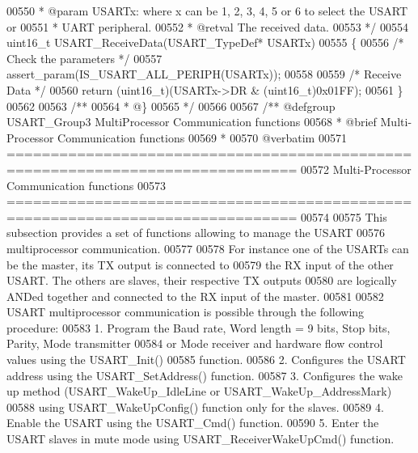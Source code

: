 \begin{DoxyCode}
00550 \textcolor{comment}{  * @param  USARTx: where x can be 1, 2, 3, 4, 5 or 6 to select the USART or }
00551 \textcolor{comment}{  *         UART peripheral.}
00552 \textcolor{comment}{  * @retval The received data.}
00553 \textcolor{comment}{  */}
00554 uint16\_t USART_ReceiveData(USART\_TypeDef* USARTx)
00555 \{
00556   \textcolor{comment}{/* Check the parameters */}
00557   assert_param(IS\_USART\_ALL\_PERIPH(USARTx));
00558 
00559   \textcolor{comment}{/* Receive Data */}
00560   \textcolor{keywordflow}{return} (uint16\_t)(USARTx->DR & (uint16\_t)0x01FF);
00561 \}
00562 
00563 \textcolor{comment}{/**}
00564 \textcolor{comment}{  * @\}}
00565 \textcolor{comment}{  */}
00566 
00567 \textcolor{comment}{/** @defgroup USART\_Group3 MultiProcessor Communication functions}
00568 \textcolor{comment}{ *  @brief   Multi-Processor Communication functions }
00569 \textcolor{comment}{ *}
00570 \textcolor{comment}{@verbatim   }
00571 \textcolor{comment}{ ===============================================================================}
00572 \textcolor{comment}{                    Multi-Processor Communication functions}
00573 \textcolor{comment}{ ===============================================================================  }
00574 \textcolor{comment}{}
00575 \textcolor{comment}{  This subsection provides a set of functions allowing to manage the USART }
00576 \textcolor{comment}{  multiprocessor communication.}
00577 \textcolor{comment}{  }
00578 \textcolor{comment}{  For instance one of the USARTs can be the master, its TX output is connected to }
00579 \textcolor{comment}{  the RX input of the other USART. The others are slaves, their respective TX outputs }
00580 \textcolor{comment}{  are logically ANDed together and connected to the RX input of the master.}
00581 \textcolor{comment}{}
00582 \textcolor{comment}{  USART multiprocessor communication is possible through the following procedure:}
00583 \textcolor{comment}{     1. Program the Baud rate, Word length = 9 bits, Stop bits, Parity, Mode transmitter }
00584 \textcolor{comment}{        or Mode receiver and hardware flow control values using the USART\_Init()}
00585 \textcolor{comment}{        function.}
00586 \textcolor{comment}{     2. Configures the USART address using the USART\_SetAddress() function.}
00587 \textcolor{comment}{     3. Configures the wake up method (USART\_WakeUp\_IdleLine or USART\_WakeUp\_AddressMark)}
00588 \textcolor{comment}{        using USART\_WakeUpConfig() function only for the slaves.}
00589 \textcolor{comment}{     4. Enable the USART using the USART\_Cmd() function.}
00590 \textcolor{comment}{     5. Enter the USART slaves in mute mode using USART\_ReceiverWakeUpCmd() function.}

\end{DoxyCode}
